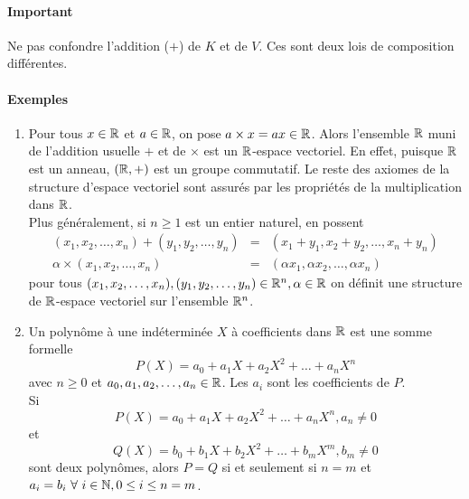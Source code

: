 \paragraph{Important} Ne pas confondre l'addition ($+$) de $K$ et de $V$. Ces sont deux lois de composition différentes.

\paragraph{Exemples}
\begin{enumerate}
  \item Pour tous $x \in \mathbb{R}$ et $a\in \mathbb{R}$, on pose $a \times x = a x \in \mathbb{R}$. Alors l'ensemble $\mathbb{R}$ muni de l'addition usuelle $+$ et de $\times$ est un $\mathbb{R}$-espace vectoriel. En effet, puisque $\mathbb{R}$ est un anneau, $(\mathbb{R}, +)$ est un groupe commutatif. Le reste des axiomes de la structure d'espace vectoriel sont assurés par les propriétés de la multiplication dans $\mathbb{R}$. \\
    Plus généralement, si $n \geq 1$ est un entier naturel, en possent
    \begin{eqnarray*}
      (x_1, x_2, \ldots, x_n) + (y_1, y_2, \ldots, y_n) &=& (x_1+y_1, x_2+y_2, \ldots, x_n+y_n) \\
      \alpha \times (x_1, x_2, \ldots, x_n) &=& (\alpha x_1, \alpha x_2, \ldots, \alpha x_n)
    \end{eqnarray*}
    pour tous $(x_1, x_2, \ldots, x_n), (y_1, y_2, \ldots, y_n) \in \mathbb{R}^n, \alpha \in \mathbb{R}$ on définit une structure de $\mathbb{R}$-espace vectoriel sur l'ensemble $\mathbb{R}^n$.
    
  \item Un polynôme à une indéterminée $X$ à coefficients dans $\mathbb{R}$ est une somme formelle 
    $$P(X) = a_0 + a_1 X + a_2 X^2 + \ldots + a_n X^{n}$$ 
    avec $n \geq 0$ et $a_0, a_1, a_2, \ldots, a_n \in \mathbb{R}$. Les $a_i$ sont les coefficients de $P$. \\
    Si 
    $$P(X) = a_0 + a_1 X + a_2 X^2 + \ldots + a_n X^{n}, a_n \neq 0$$ 
    et 
    $$Q(X) = b_0 + b_1 X + b_2 X^2 + \ldots + b_m X^{m}, b_m \neq 0$$ 
    sont deux polynômes, alors $P=Q$ si et seulement si $n=m$ et $a_i = b_i ~ \forall ~ i \in \mathbb{N}, 0 \leq i \leq n = m$. \\
    

\end{enumerate}

